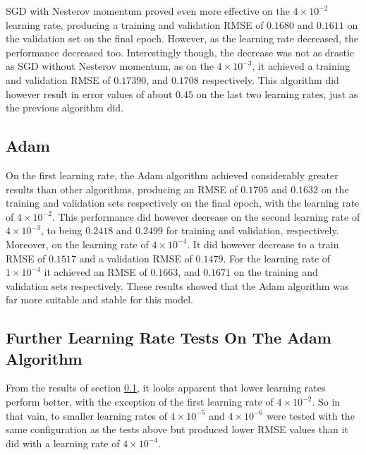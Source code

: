 \documentclass[12pt,a4paper,oneside,oldfontcommands]{memoir}
\begin{document}
\begin{Declaration Of OriginalityOrginality}
SGD with Nesterov momentum proved even more effective on the \(4\times10^{-2}\) learning rate, producing a training and validation RMSE of \(0.1680\) and \(0.1611\) on the validation set on the final epoch. However, as the learning rate decreased, the performance decreased too. Interestingly though, the decrease was not as drastic as SGD without Nesterov momentum, as on the \(4\times10^{-3}\), it achieved a training and validation RMSE of \(0.17390\), and \(0.1708\) respectively. This algorithm did however result in error values of about \(0.45\) on the last two learning rates, just as the previous algorithm did.

\subsection{Adam} \label{Adam}

On the first learning rate, the Adam algorithm achieved considerably greater results than other algorithms, producing an RMSE of \(0.1705\) and \(0.1632\) on the training and validation sets respectively on the final epoch, with the learning rate of \(4\times10^{-2}\). This performance did however decrease on the second learning rate of \(4\times10^{-3}\), to being \(0.2418\) and \(0.2499\) for training and validation, respectively. Moreover, on the learning rate of \(4\times10^{-4}\). It did however decrease to a train RMSE of \(0.1517\) and a validation RMSE of \(0.1479\). For the learning rate of \(1\times10^{-4}\) it achieved an RMSE of \(0.1663\), and \(0.1671\) on the training and validation sets respectively. These results showed that the Adam algorithm was far more suitable and stable for this model. 

\subsection{Further Learning Rate Tests On The Adam Algorithm}

From the results of section \ref{Adam}, it looks apparent that lower learning rates perform better, with the exception of the first learning rate of \(4\times10^{-2}\). So in that vain, to smaller learning rates of \(4\times10^{-5}\) and \(4\times10^{-6}\) were tested with the same configuration as the tests above but produced lower RMSE values than it did with a learning rate of \(4\times10^{-4}\).


\end{Declaration Of OriginalityOrginality}
\end{document}

